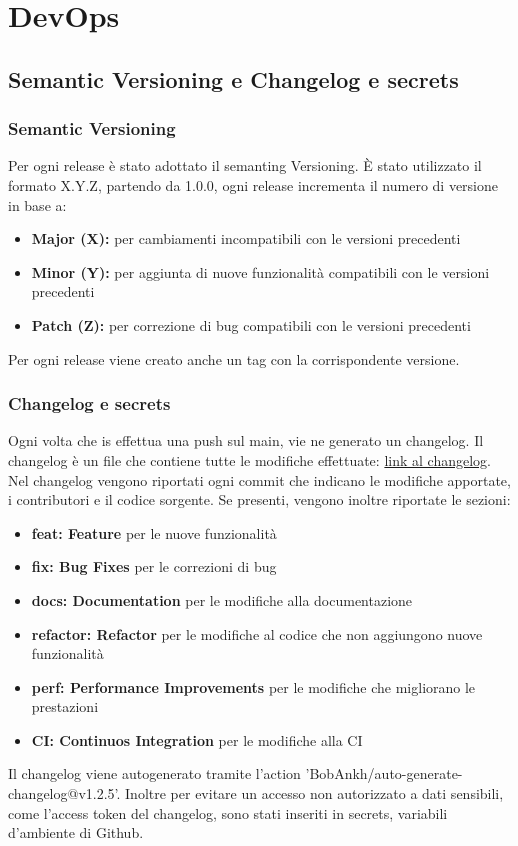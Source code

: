 
\chapter{DevOps}
\label{ch:DevOps} %
\section{Semantic Versioning e Changelog e secrets}
\subsection{Semantic Versioning}
Per ogni release è stato adottato il semanting Versioning. È stato utilizzato il formato X.Y.Z, partendo da 1.0.0, ogni release incrementa il numero di versione in base a:
\begin{itemize}
    \item \textbf{Major (X):} per cambiamenti incompatibili con le versioni precedenti
    \item \textbf{Minor (Y):} per aggiunta di nuove funzionalità compatibili con le versioni precedenti
    \item \textbf{Patch (Z):} per correzione di bug compatibili con le versioni precedenti
\end{itemize}
Per ogni release viene creato anche un tag con la corrispondente versione.
\subsection{Changelog e secrets}
Ogni volta che is effettua una push sul main, vie
ne generato un changelog. Il changelog è un file che contiene tutte le modifiche effettuate: \href{https://github.com/Sofy24/UserManagementMaraffa/blob/main/CHANGELOG.md}{link al changelog}.
Nel changelog vengono riportati ogni commit che indicano le modifiche apportate, i contributori e il codice sorgente.
Se presenti, vengono inoltre riportate le sezioni: 
\begin{itemize}
    \item \textbf{feat: Feature} per le nuove funzionalità
    \item \textbf{fix: Bug Fixes} per le correzioni di bug
    \item \textbf{docs: Documentation} per le modifiche alla documentazione
    \item \textbf{refactor: Refactor} per le modifiche al codice che non aggiungono nuove funzionalità
    \item \textbf{perf: Performance Improvements} per le modifiche che migliorano le prestazioni
    \item \textbf{CI: Continuos Integration} per le modifiche alla CI
\end{itemize}
Il changelog viene autogenerato tramite l'action 'BobAnkh/auto-generate-changelog@v1.2.5'.
Inoltre per evitare un accesso non autorizzato a dati sensibili, come l'access token del changelog, sono stati inseriti in secrets, variabili d'ambiente di Github. 
